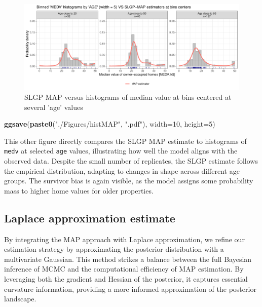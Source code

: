\documentclass[
]{article}
\newenvironment{Shaded}{\begin{snugshade}}{\end{snugshade}}
\newcommand{\AttributeTok}[1]{\textcolor[rgb]{0.13,0.29,0.53}{#1}}
\newcommand{\DecValTok}[1]{\textcolor[rgb]{0.00,0.00,0.81}{#1}}
\newcommand{\FunctionTok}[1]{\textcolor[rgb]{0.13,0.29,0.53}{\textbf{#1}}}
\newcommand{\NormalTok}[1]{#1}
\newcommand{\StringTok}[1]{\textcolor[rgb]{0.31,0.60,0.02}{#1}}
\begin{document}
\begin{figure}[H]

{\centering \includegraphics{IntroductionSLGP_files/figure-latex/SLGPplottingMAP-1} 

}

\caption{SLGP MAP versus histograms of median value at bins centered at several 'age' values}\label{fig:SLGPplottingMAP}
\end{figure}

\begin{Shaded}
\begin{Highlighting}[]

\FunctionTok{ggsave}\NormalTok{(}\FunctionTok{paste0}\NormalTok{(}\StringTok{"./Figures/histMAP"}\NormalTok{,  }\StringTok{".pdf"}\NormalTok{), }\AttributeTok{width=}\DecValTok{10}\NormalTok{, }\AttributeTok{height=}\DecValTok{5}\NormalTok{)}
\end{Highlighting}
\end{Shaded}

This other figure directly compares the SLGP MAP estimate to histograms of \texttt{medv} at selected \texttt{age} values, illustrating how well the model aligns with the observed data. Despite the small number of replicates, the SLGP estimate follows the empirical distribution, adapting to changes in shape across different age groups. The survivor bias is again visible, as the model assigns some probability mass to higher home values for older properties.

\subsection{Laplace approximation estimate}\label{laplace-approximation-estimate}

By integrating the MAP approach with Laplace approximation, we refine our estimation strategy by approximating the posterior distribution with a multivariate Gaussian. This method strikes a balance between the full Bayesian inference of MCMC and the computational efficiency of MAP estimation. By leveraging both the gradient and Hessian of the posterior, it captures essential curvature information, providing a more informed approximation of the posterior landscape.
\end{document}
